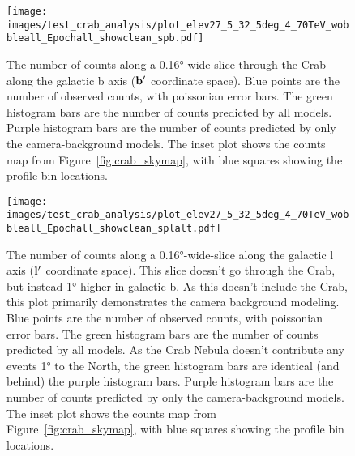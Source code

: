   \begin{figure}[h]
    \centering
    \texttt{[image: images/test\_crab\_analysis/plot\_elev27\_5\_32\_5deg\_4\_70TeV\_wobbleall\_Epochall\_showclean\_spb.pdf]}
    \caption[Crab Profile along Galactic b]
    {
      The number of counts along a \ang{0.16}-wide-slice through the Crab along the galactic b axis ($\mathbf{b'}$ coordinate space).
      Blue points are the number of observed counts, with poissonian error bars.
      The green histogram bars are the number of counts predicted by all models.
      Purple histogram bars are the number of counts predicted by only the camera-background models.
      The inset plot shows the counts map from Figure~\ref{fig:crab_skymap}, with blue squares showing the profile bin locations.
    }
    \label{fig:crab_profile_b}
  \end{figure}
    
  \begin{figure}[h]
    \centering
    \texttt{[image: images/test\_crab\_analysis/plot\_elev27\_5\_32\_5deg\_4\_70TeV\_wobbleall\_Epochall\_showclean\_splalt.pdf]}
    \caption[Crab Profile along Galactic l Off Source]
    {
      The number of counts along a \ang{0.16}-wide-slice along the galactic l axis ($\mathbf{l'}$ coordinate space).
      This slice doesn't go through the Crab, but instead \ang{1} higher in galactic b.
      As this doesn't include the Crab, this plot primarily demonstrates the camera background modeling.
      Blue points are the number of observed counts, with poissonian error bars.
      The green histogram bars are the number of counts predicted by all models.
      As the Crab Nebula doesn't contribute any events \ang{1} to the North, the green histogram bars are identical (and behind) the purple histogram bars.
      Purple histogram bars are the number of counts predicted by only the camera-background models.
      The inset plot shows the counts map from Figure~\ref{fig:crab_skymap}, with blue squares showing the profile bin locations.
    }
    \label{fig:crab_profile_l_off}
  \end{figure}

